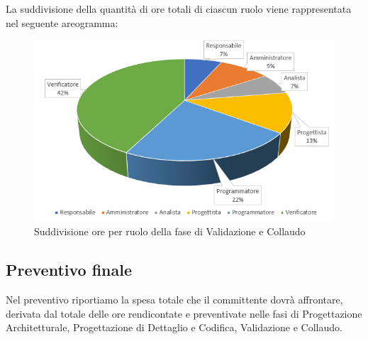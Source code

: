 La suddivisione della quantità di ore totali di ciascun ruolo viene rappresentata nel seguente areogramma:

\begin{figure}[h]
	\centering
	\caption{Suddivisione ore per ruolo della fase di Validazione e Collaudo}
	\includegraphics[scale=2.5]{sezioni/Aerogrammi/AerogrammaValidazione.png}
\end{figure}


\clearpage
\subsection{Preventivo finale} 
Nel preventivo riportiamo la spesa totale che il committente dovrà affrontare, derivata dal totale delle ore rendicontate e preventivate nelle fasi di Progettazione Architetturale, Progettazione di Dettaglio e Codifica, Validazione e Collaudo.

